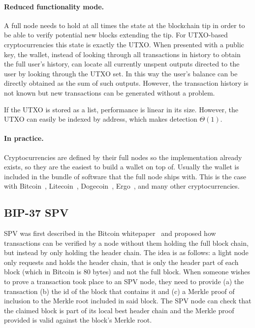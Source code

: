 \paragraph{Reduced functionality mode.}
A full node needs to hold at all times the state at the blockchain tip in order to be able to verify potential new blocks extending the tip. For UTXO-based cryptocurrencies this state is exactly the UTXO. When presented with a public key, the wallet, instead of looking through all transactions in history to obtain the full user's history, can locate all currently unspent outputs directed to the user by looking through the UTXO set. In this way the user's balance can be directly obtained as the sum of such outputs. However, the transaction history is not known but new transactions can be generated without a problem.

If the UTXO is stored as a list, performance is linear in its size. However, the UTXO can easily be indexed by address, which makes detection $\Theta(1)$.

\paragraph{In practice.}
Cryptocurrencies are defined by their full nodes so the implementation already exists, so they are the easiest to build a wallet on top of. Usually the wallet is included in the bundle of software that the full node ships with. This is the case with Bitcoin~\cite{bitcoin}, Litecoin~\cite{litecoin}, Dogecoin~\cite{dogecoin}, Ergo~\cite{ergo}, and many other cryptocurrencies.

\subsection{BIP-37 SPV}
SPV was first described in the Bitcoin whitepaper~\cite{bitcoin} and proposed how transactions can be verified by a node without them holding the full block chain, but instead by only holding the header chain.
The idea is as follows: a light node only requests and holds the header chain, that is only the header part of each block (which in Bitcoin is 80 bytes) and not the full block. When someone wishes to prove a transaction took place to an SPV node, they need to provide (a) the transaction (b) the id of the block that contains it and (c) a Merkle proof of inclusion to the Merkle root included in said block. The SPV node can check that the claimed block is part of its local best header chain and the Merkle proof provided is valid against the block's Merkle root.


